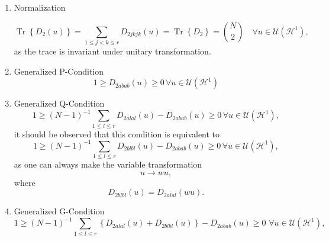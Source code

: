 \documentclass[aps,preprint]{revtex4}%
\begin{document}
\begin{enumerate}
\item Normalization%

\begin{equation}
\operatorname*{Tr}\left\{  D_{2}\left(  u\right)  \right\}  =\sum_{1\leq
j<k\leq r}D_{2jkjk}\left(  u\right)  =\operatorname*{Tr}\left\{
D_{2}\right\}  =\binom{N}{2}\quad\forall u\in\mathcal{U}\left(  \mathcal{H}%
^{1}\right)  , \label{NormCon}%
\end{equation}
as the trace is invariant under unitary transformation.

\item Generalized P-Condition%
\begin{equation}
1\geq D_{2abab}\left(  u\right)  \geq0\,\forall u\in\mathcal{U}\left(
\mathcal{H}^{1}\right)  \label{PCond}%
\end{equation}


\item Generalized Q-Condition%
\begin{equation}
1\geq\left(  N-1\right)  ^{-1}\sum_{1\leq l\leq r}D_{2alal}\left(  u\right)
-D_{2abab}\left(  u\right)  \geq0\,\forall u\in\mathcal{U}\left(
\mathcal{H}^{1}\right)  , \label{Qcond}%
\end{equation}
it should be observed that this condition is equivalent to
\begin{equation}
1\geq\left(  N-1\right)  ^{-1}\sum_{1\leq l\leq r}D_{2blbl}\left(  u\right)
-D_{2abab}\left(  u\right)  \geq0\,\forall u\in\mathcal{U}\left(
\mathcal{H}^{1}\right)  ,
\end{equation}
as one can always make the variable transformation
\begin{equation}
u\rightarrow wu,
\end{equation}
where
\begin{equation}
D_{2blbl}\left(  u\right)  =D_{2alal}\left(  wu\right)  .
\end{equation}


\item Generalized G-Condition%
\begin{equation}
1\geq\left(  N-1\right)  ^{-1}\sum_{1\leq l\leq r}\left\{  D_{2alal}\left(
u\right)  +D_{2blbl}\left(  u\right)  \right\}  -D_{2abab}\left(  u\right)
\geq0\,\,\forall u\in\mathcal{U}\left(  \mathcal{H}^{1}\right)  ,
\label{GCond}%
\end{equation}

\end{enumerate}
\end{document}
